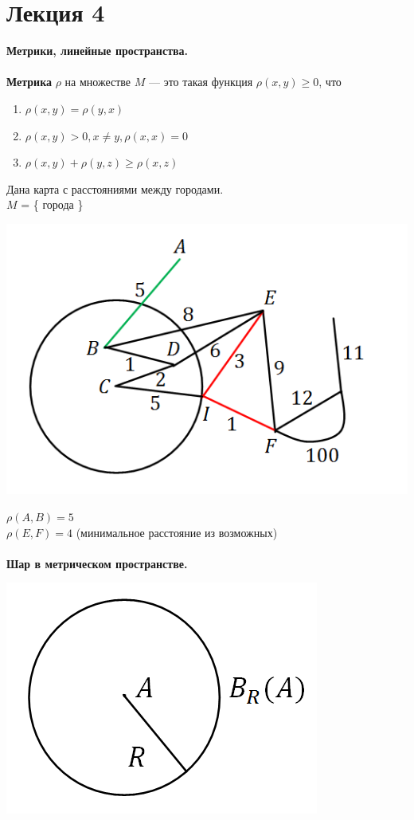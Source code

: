 \documentclass[12pt]{article}
\theoremstyle{definition}
\numberwithin{equation}{section}
\begin{document}
	\section *{Лекция 4}
	\noindent \textbf{Метрики, линейные пространства.}\\ \\
	\textbf{Метрика} $\rho$ на множестве $M$ --- это такая функция $\rho (x, y) \geqslant 0$, что 
	\begin{enumerate}
		\item $\rho (x, y) = \rho (y, x)$
		\item $\rho (x, y) > 0, x\neq y, \rho (x, x) = 0$ 
		\item $\rho (x, y) + \rho (y, z) \geqslant \rho (x, z)$
	\end{enumerate}
	Дана карта с расстояниями между городами.\\
	$M$ = \{ города \}\begin{center}
		\includegraphics[scale=0.7]{l4_1.png}\end{center}
	$\rho (A, B) = 5$\\
	$\rho (E, F) = 4$ (минимальное расстояние из возможных)\\
	\\
	\textbf{Шар в метрическом пространстве.}\begin{center}
		\includegraphics[scale=0.5]{l4_2.png}\end{center}
\end{document}
